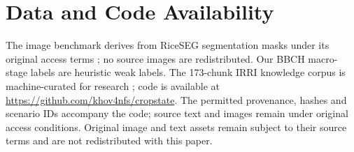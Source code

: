 \documentclass[conference,a4paper]{IEEEtran}
\begin{document}
\section{Data and Code Availability}
\label{sec:availability}

The image benchmark derives from RiceSEG segmentation masks under its original access terms \cite{zhou2025riceseg}; no source images are redistributed. Our BBCH macro-stage labels are heuristic weak labels. The 173-chunk IRRI knowledge corpus is machine-curated for research \cite{irriRiceKnowledgeBank}; code is available at \url{https://github.com/khov4nfs/cropstate}. The permitted provenance, hashes and scenario IDs accompany the code; source text and images remain under original access conditions. Original image and text assets remain subject to their source terms and are not redistributed with this paper.



\end{document}

